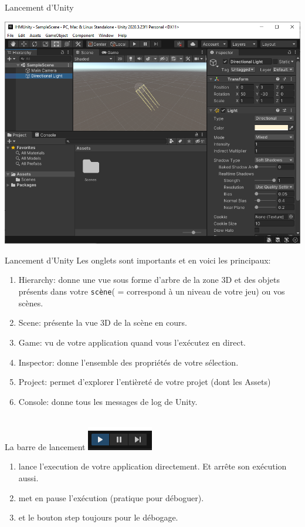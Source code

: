 \begin{frame}{Lancement d'Unity}
\begin{center}
	\includegraphics[width=1\linewidth]{../../imgs/interface_basique}
\end{center}

\end{frame}

\begin{frame}{Lancement d'Unity}
	Les onglets sont importants et en voici les principaux:
\begin{enumerate}
	\item Hierarchy: donne une vue sous forme d'arbre de la zone 3D et des objets présents dans votre \texttt{scène}( = correspond à un niveau de votre jeu) ou vos scènes.
	\item Scene: présente la vue 3D de la scène en cours.
	 \item Game: vu de votre application quand vous l'exécutez en direct.
	 \item Inspector: donne l'ensemble des propriétés de votre sélection.
	 \item Project: permet d'explorer l'entièreté de votre projet (dont les Assets)
	 \item Console: donne tous les messages de log de Unity.
\end{enumerate}	

~\\

La barre de lancement 
\includegraphics[width=0.1\linewidth]{../../imgs/unity_barre_lancement}

\begin{enumerate}
	\item lance l'execution de votre application directement. Et arrête son exécution aussi.
	\item met en pause l'exécution (pratique pour déboguer).
	\item et le bouton step toujours pour le débogage.
\end{enumerate}
\end{frame}

